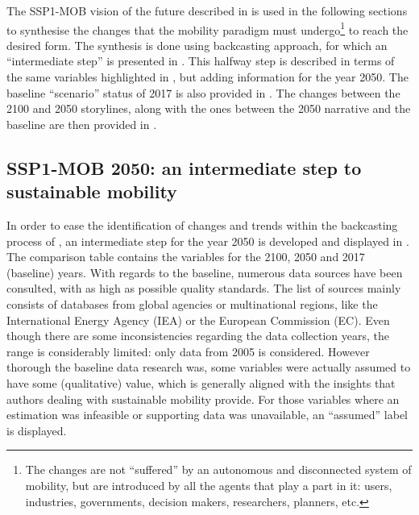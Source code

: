 The SSP1-MOB vision of the future described in  is used in the following sections to synthesise the changes that the mobility paradigm must undergo\footnote{The changes are not ``suffered'' by an autonomous and disconnected system of mobility, but are introduced by all the agents that play a part in it: users, industries, governments, decision makers, researchers, planners, etc.} to reach the desired form. The synthesis is done using backcasting approach, for which an ``intermediate step'' is presented in . This halfway step is described in terms of the same variables highlighted in , but adding information for the year 2050. The baseline ``scenario'' status of 2017 is also provided in . The changes between the 2100 and 2050 storylines, along with the ones between the 2050 narrative and the baseline are then provided in .

\subsection{SSP1-MOB 2050: an intermediate step to sustainable mobility}
\label{ss:results:backcasting-2050-intermediate-step}
In order to ease the identification of changes and trends within the backcasting process of , an intermediate step for the year 2050 is developed and displayed in . The comparison table contains the variables for the 2100, 2050 and 2017 (baseline) years. With regards to the baseline, numerous data sources have been consulted, with as high as possible quality standards. The list of sources mainly consists of databases from global agencies or multinational regions, like the International Energy Agency (IEA) or the European Commission (EC). Even though there are some inconsistencies regarding the data collection years, the range is considerably limited: only data from 2005 is considered. However thorough the baseline data research was, some variables were actually assumed to have some (qualitative) value, which is generally aligned with the insights that authors dealing with sustainable mobility provide. For those variables where an estimation was infeasible or supporting data was unavailable, an ``assumed'' label is displayed.


